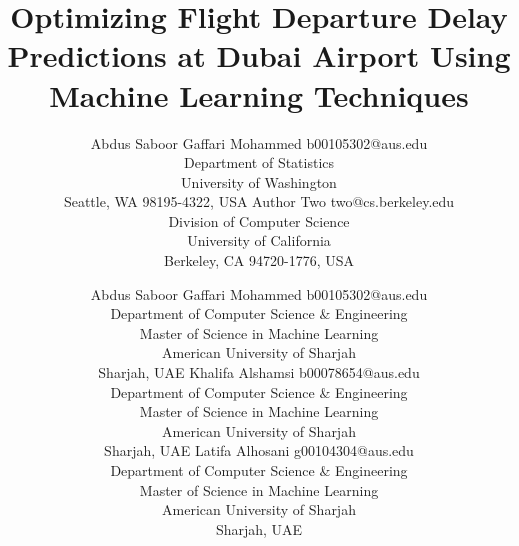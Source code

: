 \documentclass[twoside,11pt]{article}
\begin{document}
\title{Optimizing Flight Departure Delay Predictions at Dubai Airport Using Machine Learning Techniques}

\author{\name Abdus Saboor Gaffari Mohammed \email b00105302@aus.edu \\
       \addr Department of Statistics\\
       University of Washington\\
       Seattle, WA 98195-4322, USA
       \AND
       \name Author Two \email two@cs.berkeley.edu \\
       \addr Division of Computer Science\\
       University of California\\
       Berkeley, CA 94720-1776, USA}

\author{\name Abdus Saboor Gaffari Mohammed \email b00105302@aus.edu \\
        \addr Department of Computer Science \& Engineering\\
        Master of Science in Machine Learning\\
        American University of Sharjah\\
        Sharjah, UAE
        \AND
        \name Khalifa Alshamsi \email b00078654@aus.edu \\
        \addr Department of Computer Science \& Engineering\\
        Master of Science in Machine Learning\\
        American University of Sharjah\\
        Sharjah, UAE
        \AND
        \name Latifa Alhosani \email g00104304@aus.edu \\
        \addr Department of Computer Science \& Engineering\\
        Master of Science in Machine Learning\\
        American University of Sharjah\\
        Sharjah, UAE
       }


\maketitle
\end{document}
